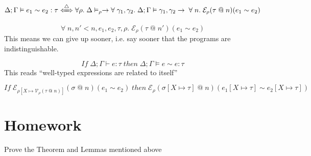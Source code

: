 \documentclass{notes}
\newcommand{\V}{\mathcal{V}}
\newcommand{\E}{\mathcal{E}}
\begin{document}
\begin{defn}
  \[\Delta;\Gamma\vDash e_1\sim e_2:\tau \xLeftrightarrow{\triangle} \forall \rho. \; \Delta \vDash_\rho \to \forall\; \gamma_1, \gamma_2. \; \Delta; \Gamma \vDash \gamma_1, \gamma_2 \to \; \forall\; n.\; \E_\rho(\tau\;@\;n)(e_1\sim e_2)\]
\end{defn}

\begin{lem} [Monotonicity]
\[\forall\; n, n'<n, e_1, e_2, \tau, \rho. \; \E_\rho (\tau\;@\;n')(e_1\sim e_2) \]
This means we can give up sooner, i.e. say sooner that the programs are indistinguishable.
\end{lem}
\begin{thm}
  \[If \; \Delta;\Gamma\vdash e:\tau\; then \; \Delta ; \Gamma \vDash e \sim e:\tau\]
  This reads ``well-typed expressions are related to itself''
\end{thm}
\begin{lem}
  \[If \; \E_{\rho[X \mapsto \V_\rho (\tau\;@\;n)]}(\sigma\;@\;n) (e_1 \sim e_2)\; then \; \E_\rho (\sigma[X \mapsto \tau]\;@\;n) (e_1[X \mapsto \tau] \sim e_2[X \mapsto \tau]) \]
\end{lem}
\section{Homework}
Prove the Theorem and Lemmas mentioned above
\end{document}

